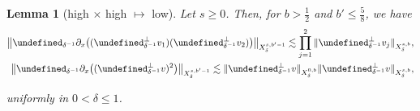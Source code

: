 \documentclass[letterpaper, 11pt,  reqno]{amsart}
\newtheorem{lemma}[theorem]{Lemma}
\newcommand{\1}{\hspace{0.5mm}\textup{I}\hspace{0.5mm}}
\newcommand{\noi}{\noindent}
\let\P= \undefined
\newcommand{\P}{\mathbf{P}}
\newcommand{\dl}{\delta}
\newcommand{\dx}{\partial_x}
\newcommand{\les}{\lesssim}
\numberwithin{equation}{section}
\numberwithin{theorem}{section}
\begin{document}
\begin{lemma}[high $\times$ high $\mapsto$ low] \label{LEM:bilin2}
Let $s \ge 0$.
Then, for  $b > \frac 12$ and $b' \le \frac 58 $, we have 
\begin{align}
\big\| \P_{ \dl^{-1}}\dx\big( (\P_{ \dl^{-1}}^\perp v_1) (\P_{ \dl^{-1}}^\perp v_2)\big)\big\|_{X^{s, b'-1}_\dl} 
\les \prod_{j = 1}^2 \| \P_{ \dl^{-1}}^\perp v_j\|_{X^{s, b}_\dl}, 
\label{bilin2}\\
\big\| \P_{ \dl^{-1}}\dx\big( (\P_{ \dl^{-1}}^\perp v)^2\big)\big\|_{X^{s, b'-1}_\dl} 
\les \| \P_{ \dl^{-1}}^\perp v\|_{X^{0, b}_\dl}\| \P_{ \dl^{-1}}^\perp v\|_{X^{s, b}_\dl}, 
\label{bilin2x}
\end{align}


\noi
uniformly in $0 < \dl \le1$.

\end{lemma}
\end{document}
